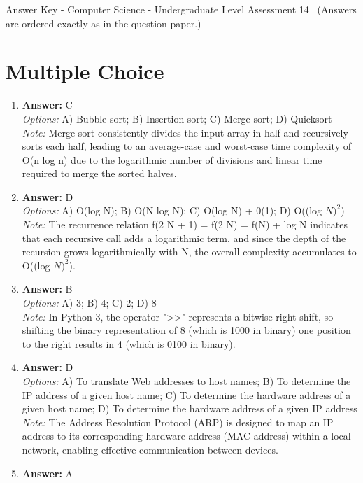 \documentclass[12pt]{article}
\begin{document}
\begin{center}
Answer Key - Computer Science - Undergraduate Level Assessment 14 \
\small (Answers are ordered exactly as in the question paper.)
\end{center}

\section*{Multiple Choice}
\begin{enumerate}[label=\arabic*.]
\item \textbf{Answer:} C
\\ \textit{Options:} A) Bubble sort; B) Insertion sort; C) Merge sort; D) Quicksort
\\ \textit{Note:} Merge sort consistently divides the input array in half and recursively sorts each half, leading to an average-case and worst-case time complexity of O(n log n) due to the logarithmic number of divisions and linear time required to merge the sorted halves.
\item \textbf{Answer:} D
\\ \textit{Options:} A) O(log N); B) O(N log N); C) O(log N) + 0(1); D) O((log $N)^2$)
\\ \textit{Note:} The recurrence relation f(2 N + 1) = f(2 N) = f(N) + log N indicates that each recursive call adds a logarithmic term, and since the depth of the recursion grows logarithmically with N, the overall complexity accumulates to O((log $N)^2$).
\item \textbf{Answer:} B
\\ \textit{Options:} A) 3; B) 4; C) 2; D) 8
\\ \textit{Note:} In Python 3, the operator "\textgreater{}\textgreater{}" represents a bitwise right shift, so shifting the binary representation of 8 (which is 1000 in binary) one position to the right results in 4 (which is 0100 in binary).
\item \textbf{Answer:} D
\\ \textit{Options:} A) To translate Web addresses to host names; B) To determine the IP address of a given host name; C) To determine the hardware address of a given host name; D) To determine the hardware address of a given IP address
\\ \textit{Note:} The Address Resolution Protocol (ARP) is designed to map an IP address to its corresponding hardware address (MAC address) within a local network, enabling effective communication between devices.
\item \textbf{Answer:} A

\end{enumerate}
\end{document}
